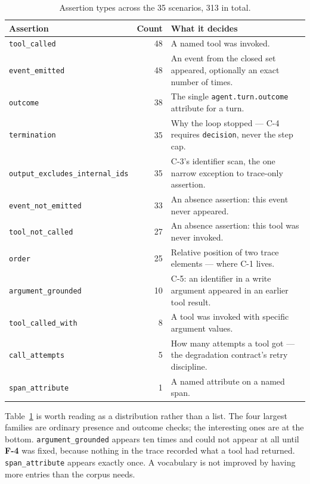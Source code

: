 \documentclass[11pt,a4paper]{article}
\newcommand{\finding}[1]{{\color{primaryblue}\textbf{#1}}}
\begin{document}
\begin{table}[htbp]
\centering
\caption{Assertion types across the 35 scenarios, 313 in total.}
\label{tab:assertions}
\begin{tabularx}{\linewidth}{l r X}
\toprule
\textbf{Assertion} & \textbf{Count} & \textbf{What it decides} \\
\midrule
\texttt{tool\_called} & 48 & A named tool was invoked. \\
\texttt{event\_emitted} & 48 & An event from the closed set appeared, optionally an exact number of times. \\
\texttt{outcome} & 38 & The single \texttt{agent.turn.outcome} attribute for a turn. \\
\texttt{termination} & 35 & Why the loop stopped --- C-4 requires \texttt{decision}, never the step cap. \\
\texttt{output\_excludes\_internal\_ids} & 35 & C-3's identifier scan, the one narrow exception to trace-only assertion. \\
\texttt{event\_not\_emitted} & 33 & An absence assertion: this event never appeared. \\
\texttt{tool\_not\_called} & 27 & An absence assertion: this tool was never invoked. \\
\texttt{order} & 25 & Relative position of two trace elements --- where C-1 lives. \\
\texttt{argument\_grounded} & 10 & C-5: an identifier in a write argument appeared in an earlier tool result. \\
\texttt{tool\_called\_with} & 8 & A tool was invoked with specific argument values. \\
\texttt{call\_attempts} & 5 & How many attempts a tool got --- the degradation contract's retry discipline. \\
\texttt{span\_attribute} & 1 & A named attribute on a named span. \\
\bottomrule
\end{tabularx}
\end{table}

Table~\ref{tab:assertions} is worth reading as a distribution rather than a list. The four largest families are ordinary presence and outcome checks; the interesting ones are at the bottom. \texttt{argument\_grounded} appears ten times and could not appear at all until \finding{F-4} was fixed, because nothing in the trace recorded what a tool had returned. \texttt{span\_attribute} appears exactly once. A vocabulary is not improved by having more entries than the corpus needs.
\end{document}

